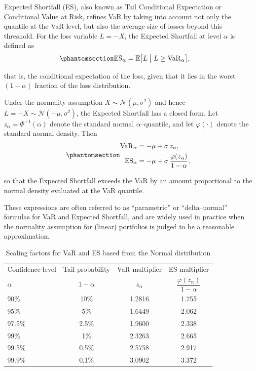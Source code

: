 \documentclass[
  letterpaper,
  DIV=11,
  numbers=noendperiod]{scrreprt}
\begin{document}
Expected Shortfall (ES), also known as Tail Conditional Expectation or
Conditional Value at Risk, refines VaR by taking into account not only
the quantile at the VaR level, but also the average size of losses
beyond this threshold. For the loss variable \(L=-X\), the Expected
Shortfall at level \(\alpha\) is defined as
\begin{equation}\protect\phantomsection\label{eq-gen-0072}{  
\begin{align}
    \mathrm{ES}_{\alpha}  &= \mathbb{E}\big[L \;\big|\; L \geq \mathrm{VaR}_{\alpha}\big],
\end{align}
}\end{equation}

that is, the conditional expectation of the loss, given that it lies in
the worst \((1-\alpha)\) fraction of the loss distribution.

Under the normality assumption \(X\sim\mathcal{N}(\mu,\sigma^{2})\) and
hence \(L=-X\sim\mathcal{N}(-\mu,\sigma^{2})\), the Expected Shortfall
has a closed form. Let \(z_{\alpha}=\Phi^{-1}(\alpha)\) denote the
standard normal \(\alpha\)--quantile, and let \(\varphi(\cdot)\) denote
the standard normal density. Then
\begin{equation}\protect\phantomsection\label{eq-gen-0073}{ 
\begin{align}
    \mathrm{VaR}_{\alpha} &= -\mu + \sigma\,z_{\alpha}, \\
    \mathrm{ES}_{\alpha}  &= -\mu + \sigma\,\frac{\varphi(z_{\alpha})}{1-\alpha},
\end{align}
}\end{equation}

so that the Expected Shortfall exceeds the VaR by an amount proportional
to the normal density evaluated at the VaR quantile.

These expressions are often referred to as ``parametric'' or
``delta--normal'' formulas for VaR and Expected Shortfall, and are
widely used in practice when the normality assumption for (linear)
portfolios is judged to be a reasonable approximation.

\begin{longtable}[]{@{}lccc@{}}
\caption{Scaling factors for VaR and ES based from the Normal
distribution}\tabularnewline
\toprule\noalign{}
\endfirsthead
\endhead
\bottomrule\noalign{}
\endlastfoot
Confidence level & Tail probability & VaR multiplier & ES multiplier \\
\(\alpha\) & \(1-\alpha\) & \(z_{\alpha}\) &
\(\dfrac{\varphi(z_{\alpha})}{1-\alpha}\) \\
90\% & 10\% & 1.2816 & 1.755 \\
95\% & 5\% & 1.6449 & 2.062 \\
97.5\% & 2.5\% & 1.9600 & 2.338 \\
99\% & 1\% & 2.3263 & 2.665 \\
99.5\% & 0.5\% & 2.5758 & 2.917 \\
99.9\% & 0.1\% & 3.0902 & 3.372 \\
\end{longtable}
\end{document}
